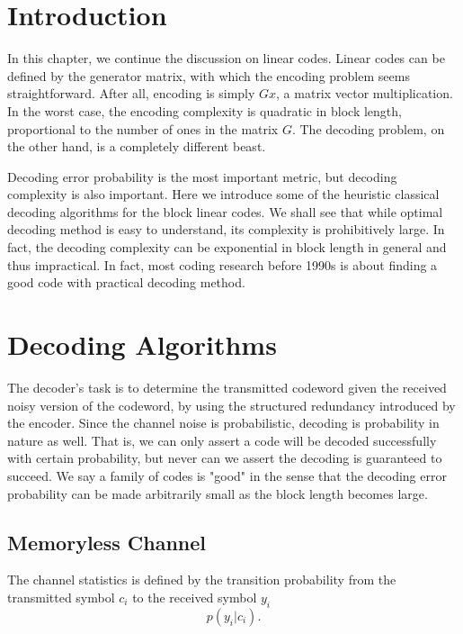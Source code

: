 
\Contributor{}

\lstset{style=mystyle}

	\MakeScribeTop

\section{Introduction}
In this chapter, we continue the discussion on linear codes. Linear codes can be defined by the generator matrix, with which the encoding problem seems straightforward. After all, encoding is simply \(Gx\), a matrix vector multiplication. In the worst case, the encoding complexity is quadratic in block length, proportional to the number of ones in the matrix \(G\). The decoding problem, on the other hand, is a completely different beast. 


Decoding error probability is the most important metric, but decoding complexity is also important. Here we introduce some of the heuristic classical decoding algorithms for the block linear codes. We shall see that while optimal decoding method is easy to understand, its complexity is prohibitively large. In fact, the decoding complexity can be exponential in block length in general and thus impractical. In fact, most coding research before 1990s is about finding a good code with practical decoding method. 

\section{Decoding Algorithms}
The decoder's task is to determine the transmitted codeword given the received noisy version of the codeword, by using the structured redundancy introduced by the encoder. Since the channel noise is probabilistic, decoding is probability in nature as well. That is, we can only assert a code will be decoded successfully with certain probability, but never can we assert the decoding is guaranteed to succeed. We say a family of codes is "good" in the sense that the decoding error probability can be made arbitrarily small as the block length becomes large.   

\subsection{Memoryless Channel}
The channel statistics is defined by the transition probability from the transmitted symbol \(c_i\) to the received symbol \(y_i\) 
\[p(y_i|c_i). \] 



